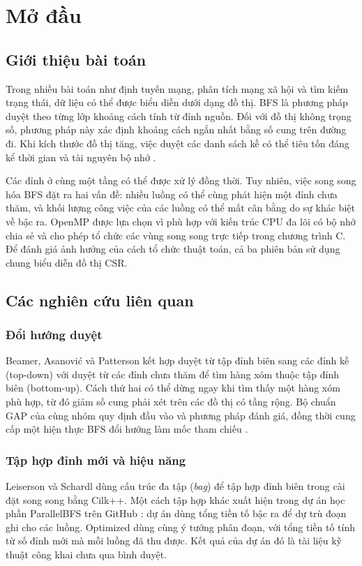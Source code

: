 \chapter{Mở đầu}
\label{chap:intro}

\section{Giới thiệu bài toán}
Trong nhiều bài toán như định tuyến mạng, phân tích mạng xã hội và tìm kiếm trạng thái, dữ liệu có thể được biểu diễn dưới dạng đồ thị. BFS là phương pháp duyệt theo từng lớp khoảng cách tính từ đỉnh nguồn. Đối với đồ thị không trọng số, phương pháp này xác định khoảng cách ngắn nhất bằng số cung trên đường đi. Khi kích thước đồ thị tăng, việc duyệt các danh sách kề có thể tiêu tốn đáng kể thời gian và tài nguyên bộ nhớ \cite{clrs2022}.

Các đỉnh ở cùng một tầng có thể được xử lý đồng thời. Tuy nhiên, việc song song hóa BFS đặt ra hai vấn đề: nhiều luồng có thể cùng phát hiện một đỉnh chưa thăm, và khối lượng công việc của các luồng có thể mất cân bằng do sự khác biệt về bậc ra. OpenMP được lựa chọn vì phù hợp với kiến trúc CPU đa lõi có bộ nhớ chia sẻ và cho phép tổ chức các vùng song song trực tiếp trong chương trình C. Để đánh giá ảnh hưởng của cách tổ chức thuật toán, cả ba phiên bản sử dụng chung biểu diễn đồ thị CSR.

\section{Các nghiên cứu liên quan}
\subsection{Đổi hướng duyệt}
Beamer, Asanović và Patterson \cite{beamer2013} kết hợp duyệt từ tập đỉnh biên sang các đỉnh kề (top-down) với duyệt từ các đỉnh chưa thăm để tìm hàng xóm thuộc tập đỉnh biên (bottom-up). Cách thứ hai có thể dừng ngay khi tìm thấy một hàng xóm phù hợp, từ đó giảm số cung phải xét trên các đồ thị có tầng rộng. Bộ chuẩn GAP của cùng nhóm quy định đầu vào và phương pháp đánh giá, đồng thời cung cấp một hiện thực BFS đổi hướng làm mốc tham chiếu \cite{gap2015}.

\subsection{Tập hợp đỉnh mới và hiệu năng}
Leiserson và Schardl \cite{leiserson2010} dùng cấu trúc đa tập (\textit{bag}) để tập hợp đỉnh biên trong cài đặt song song bằng Cilk++. Một cách tập hợp khác xuất hiện trong dự án học phần ParallelBFS trên GitHub \cite{parallelbfs}: dự án dùng tổng tiền tố bậc ra để dự trù đoạn ghi cho các luồng. Optimized dùng cùng ý tưởng phân đoạn, với tổng tiền tố tính từ số đỉnh mới mà mỗi luồng đã thu được. Kết quả của dự án đó là tài liệu kỹ thuật công khai chưa qua bình duyệt.


